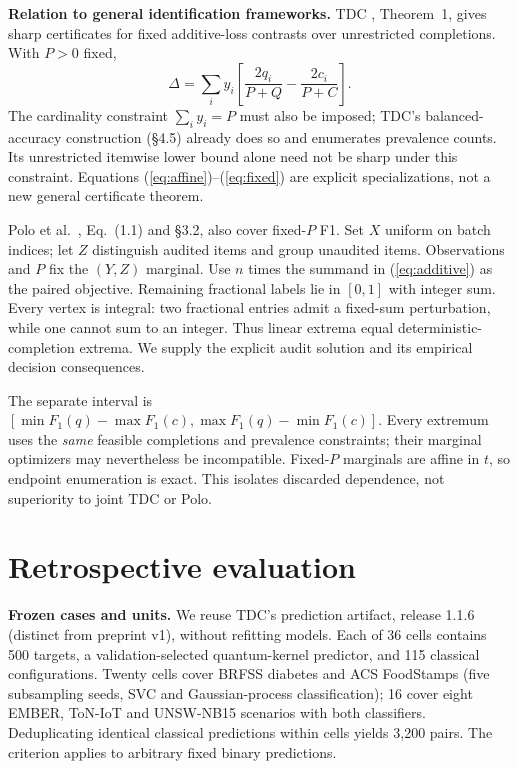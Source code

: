 \documentclass[a4paper]{esannV2}
\newcommand{\F}{F_1}
\begin{document}
\medskip\noindent\textbf{Relation to general identification frameworks.}
TDC \cite{tdc}, Theorem~1, gives sharp certificates for fixed additive-loss
contrasts over unrestricted completions. With $P>0$ fixed,
\begin{equation}\label{eq:additive}
 \Delta=\sum_i y_i\left[\frac{2q_i}{P+Q}-\frac{2c_i}{P+C}\right].
\end{equation}
The cardinality constraint $\sum_i y_i=P$ must also be imposed; TDC's
balanced-accuracy construction (\S4.5) already does so and enumerates
prevalence counts. Its unrestricted itemwise lower bound alone need not be
sharp under this constraint. Equations (\ref{eq:affine})--(\ref{eq:fixed})
are explicit specializations, not a new general certificate theorem.

Polo et al.\ \cite{polo2024}, Eq.~(1.1) and \S3.2, also cover fixed-$P$
F1. Set $X$ uniform on batch indices; let $Z$ distinguish audited items and
group unaudited items. Observations and $P$ fix the $(Y,Z)$ marginal. Use $n$
times the summand in (\ref{eq:additive}) as the paired objective. Remaining
fractional labels lie in $[0,1]$ with integer sum. Every vertex is integral:
two fractional entries admit a fixed-sum perturbation, while one cannot sum
to an integer. Thus linear extrema equal deterministic-completion extrema.
We supply the explicit audit solution and its empirical decision consequences.

The separate interval is
$[\min\F(q)-\max\F(c),\allowbreak\max\F(q)-\min\F(c)]$. Every extremum uses the
\emph{same} feasible completions and prevalence constraints; their marginal
optimizers may nevertheless be incompatible. Fixed-$P$ marginals are affine
in $t$, so endpoint enumeration is exact. This isolates discarded dependence,
not superiority to joint TDC or Polo.

\section{Retrospective evaluation}
\textbf{Frozen cases and units.} We reuse TDC's prediction artifact, release
1.1.6 (distinct from preprint v1), without refitting models. Each of 36 cells
contains 500 targets, a validation-selected quantum-kernel predictor, and
115 classical configurations. Twenty cells cover BRFSS diabetes and ACS
FoodStamps (five subsampling seeds, SVC and Gaussian-process classification);
16 cover eight EMBER, ToN-IoT and UNSW-NB15 scenarios with both classifiers.
Deduplicating identical classical predictions within cells yields 3,200 pairs.
The criterion applies to arbitrary fixed binary predictions.
\end{document}
